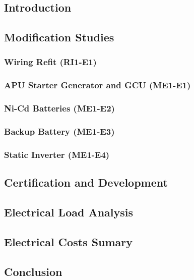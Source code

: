 \subsection{Introduction}
	

\subsection{Modification Studies}
    \subsubsection{Wiring Refit (RI1-E1)}
        
    \subsubsection{APU Starter Generator and GCU (ME1-E1)}
        
    \subsubsection{Ni-Cd Batteries (ME1-E2)}
        
    \subsubsection{Backup Battery (ME1-E3)}
        
    \subsubsection{Static Inverter (ME1-E4)}
        

\subsection{Certification and Development}
         

\subsection{Electrical Load Analysis}
         

\subsection{Electrical Costs Sumary}
         

\subsection{Conclusion}
         

